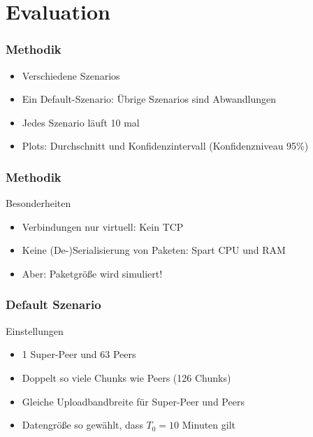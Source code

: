 \section{Evaluation}

\begin{frame}
  \frametitle{Methodik}
  \begin{itemize}  
  	\item Verschiedene Szenarios
  	\vspace{1mm}
    \item Ein Default-Szenario: Übrige Szenarios sind Abwandlungen
    \vspace{1mm}
    \item Jedes Szenario läuft 10 mal
    \vspace{1mm}
    \item Plots: Durchschnitt und Konfidenzintervall (Konfidenzniveau 95\%)
  \end{itemize}	
\end{frame}



\begin{frame}
  \frametitle{Methodik}
  \begin{block}{Besonderheiten}
    \begin{itemize}
      \item Verbindungen nur virtuell: Kein TCP
      \vspace{2mm}
      \item Keine (De-)Serialisierung von Paketen: Spart CPU und RAM
      \vspace{2mm}
      \item Aber: Paketgröße wird simuliert!
    \end{itemize}
  \end{block}
\end{frame}



\begin{frame}
  \frametitle{Default Szenario}
  \begin{block}{Einstellungen}
	  \begin{itemize}  
	    \item 1 Super-Peer und 63 Peers
	    \vspace{2mm}
	    \item Doppelt so viele Chunks wie Peers (126 Chunks)
	    \vspace{2mm}
	    \item Gleiche Uploadbandbreite für Super-Peer und Peers
	    \vspace{2mm}
	    \item Datengröße so gewählt, dass $T_0=10$ Minuten gilt 
	  \end{itemize}		
  \end{block}
\end{frame}


